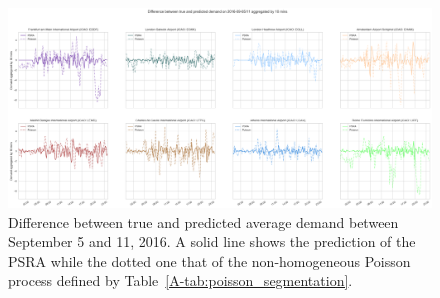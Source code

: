 \documentclass[draft,review]{elsarticle}
\begin{document}
\begin{figure}
    \includegraphics[width=\textwidth]{prediction_last_week}
    \caption{Difference between true and predicted average demand between September 5 and 11, 2016. A solid line shows the prediction of the \acs{PSRA} while the dotted one that of the non-homogeneous Poisson process defined by Table~\ref{A-tab:poisson_segmentation}.}
    \label{fig:pred_last_week}
\end{figure}
\end{document}
